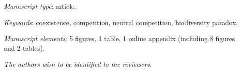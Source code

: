 \documentclass[a4paper, onecolumn, 10pt]{article}
\begin{document}
\maketitle

\bigskip
\textit{Manuscript type}: article.

\bigskip
\textit{Keywords}: coexistence, competition, neutral competition, biodiversity paradox.

\bigskip
\textit{Manuscript elements}: 5 figures, 1 table, 1 online appendix (including 8 figures and 2 tables).

\bigskip
\textit{The authors wish to be identified to the reviewers.}

\newpage


\newpage






\clearpage


\clearpage

\end{document}
